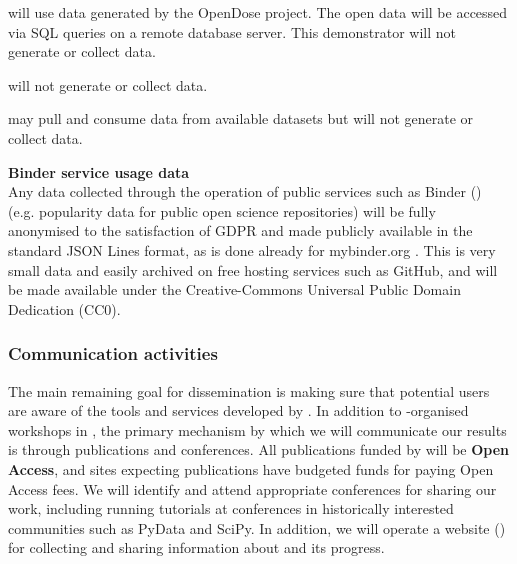 \noindent {}
will use data generated by the
OpenDose project. The open data will be accessed via SQL queries on a remote
database server. This demonstrator will not generate or collect data.

\noindent {}
will not generate or collect data.

\noindent {}
may pull and consume data from available datasets but will not
generate or collect data.

\noindent \textbf{Binder service usage data} \\
Any data collected through the operation of public services such as Binder ()
(e.g. popularity data for public open science repositories)
will be fully anonymised to the satisfaction of GDPR
and made publicly available in the standard JSON Lines format,
as is done already for mybinder.org \cite{mybinder-archive}.
This is very small data and easily archived on free hosting services such as GitHub,
and will be made available under the Creative-Commons Universal Public Domain Dedication (CC0).


\subsubsection{Communication activities}

The main remaining goal for dissemination is making sure that potential users are aware of the tools and services developed by \TheProject.
In addition to \TheProject-organised workshops in ,
the primary mechanism by which we will communicate our results is through publications and conferences.
All publications funded by \TheProject will be \textbf{Open Access},
and sites expecting publications have budgeted funds for paying Open Access fees.
We will identify and attend appropriate conferences for sharing our work,
including running tutorials at conferences in historically interested communities such as PyData and SciPy. In addition, we will operate a website ()
for collecting and sharing information about \TheProject and its progress.

